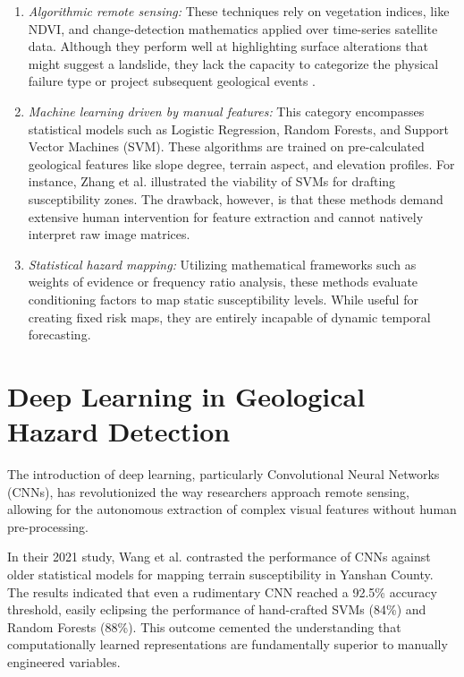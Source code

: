 \documentclass[12pt,a4paper]{report}
\begin{document}
\begin{enumerate}
    \item \textit{Algorithmic remote sensing:} These techniques rely on vegetation indices, like NDVI, and change-detection mathematics applied over time-series satellite data. Although they perform well at highlighting surface alterations that might suggest a landslide, they lack the capacity to categorize the physical failure type or project subsequent geological events \cite{ghorbanzadeh2019unet}.

    \item \textit{Machine learning driven by manual features:} This category encompasses statistical models such as Logistic Regression, Random Forests, and Support Vector Machines (SVM). These algorithms are trained on pre-calculated geological features like slope degree, terrain aspect, and elevation profiles. For instance, Zhang et al. \cite{zhang2020landslide_review} illustrated the viability of SVMs for drafting susceptibility zones. The drawback, however, is that these methods demand extensive human intervention for feature extraction and cannot natively interpret raw image matrices.

    \item \textit{Statistical hazard mapping:} Utilizing mathematical frameworks such as weights of evidence or frequency ratio analysis, these methods evaluate conditioning factors to map static susceptibility levels. While useful for creating fixed risk maps, they are entirely incapable of dynamic temporal forecasting.
\end{enumerate}

\section{Deep Learning in Geological Hazard Detection}
The introduction of deep learning, particularly Convolutional Neural Networks (CNNs), has revolutionized the way researchers approach remote sensing, allowing for the autonomous extraction of complex visual features without human pre-processing.

In their 2021 study, Wang et al. \cite{wang2021landslide} contrasted the performance of CNNs against older statistical models for mapping terrain susceptibility in Yanshan County. The results indicated that even a rudimentary CNN reached a 92.5\% accuracy threshold, easily eclipsing the performance of hand-crafted SVMs (84\%) and Random Forests (88\%). This outcome cemented the understanding that computationally learned representations are fundamentally superior to manually engineered variables.
\end{document}
